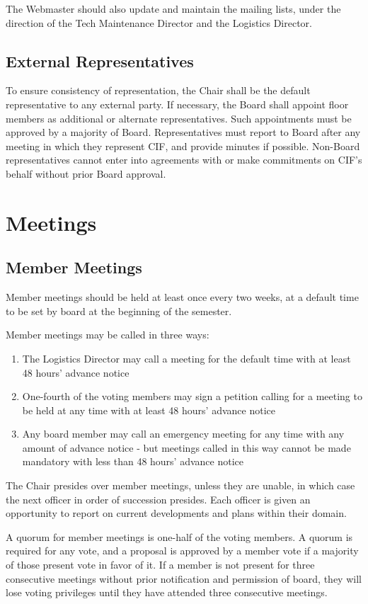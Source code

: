 \documentclass[12pt]{amsart}
\begin{document}
	The Webmaster should also update and maintain the mailing lists, under the direction of the Tech Maintenance Director and the Logistics Director.
	\subsection{External Representatives}
	To ensure consistency of representation, the Chair shall be the default representative to any external party. If necessary, the Board shall appoint floor members as additional or alternate representatives. Such appointments must be approved by a majority of Board. Representatives must report to Board after any meeting in which they represent CIF, and provide minutes if possible. Non-Board representatives cannot enter into agreements with or make commitments on CIF's behalf without prior Board approval.
 
\section{Meetings}
\subsection {Member Meetings}
Member meetings should be held at least once every two weeks, at a default time to be set by board at the beginning of the semester. 

Member meetings may be called in three ways:
\begin{enumerate}
	\item The Logistics Director may call a meeting for the default time with at least 48 hours' advance notice
	\item One-fourth of the voting members may sign a petition calling for a meeting to be held at any time with at least 48 hours' advance notice
	\item Any board member may call an emergency meeting for any time with any amount of advance notice - but meetings called in this way cannot be made mandatory with less than 48 hours' advance notice
\end{enumerate}

The Chair presides over member meetings, unless they are unable, in which case the next officer in order of succession presides. Each officer is given an opportunity to report on current developments and plans within their domain.

A quorum for member meetings is one-half of the voting members. A quorum is required for any vote, and a proposal is approved by a member vote if a majority of those present vote in favor of it.
If a member is not present for three consecutive meetings without prior notification and permission of board, they will lose voting privileges until they have attended three consecutive meetings.
\end{document}
